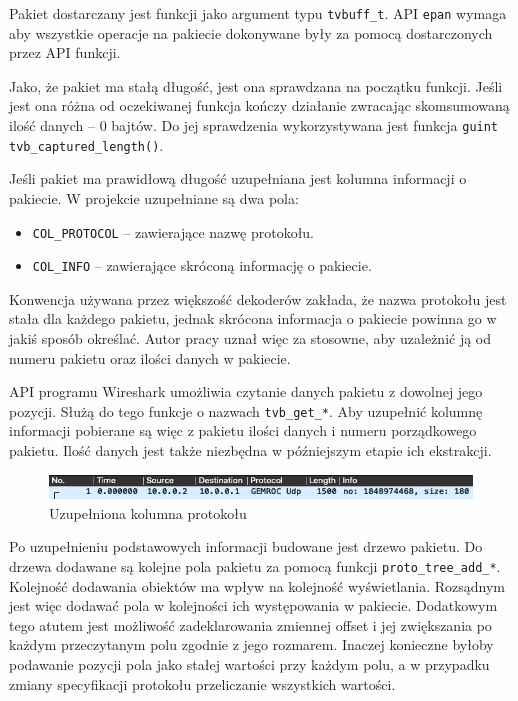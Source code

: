 \documentclass[a4paper, 12pt, twoside, openright]{article}
\begin{document}
Pakiet dostarczany jest funkcji jako argument typu \texttt{tvbuff\_t}. API \texttt{epan} wymaga aby wszystkie operacje
na pakiecie dokonywane były za pomocą dostarczonych przez API funkcji.

Jako, że pakiet ma stałą długość, jest ona sprawdzana na początku funkcji. Jeśli jest ona różna od oczekiwanej funkcja
kończy działanie zwracając skomsumowaną ilość danych -- 0 bajtów. Do jej sprawdzenia wykorzystywana jest funkcja
\texttt{guint tvb\_captured\_length()}.

Jeśli pakiet ma prawidłową długość uzupełniana jest kolumna informacji o pakiecie. W projekcie uzupełniane są dwa pola:
\begin{itemize}
	\item \texttt{COL\_PROTOCOL} -- zawierające nazwę protokołu.
	\item \texttt{COL\_INFO} -- zawierające skróconą informację o pakiecie.
\end{itemize}
Konwencja używana przez większość dekoderów zakłada, że nazwa protokołu jest stała dla każdego pakietu, jednak skrócona
informacja o pakiecie powinna go w jakiś sposób określać. Autor pracy uznał więc za stosowne, aby uzależnić ją
od numeru pakietu oraz ilości danych w pakiecie.

API programu Wireshark umożliwia czytanie danych pakietu z dowolnej jego pozycji. Służą do tego funkcje o nazwach \texttt{tvb\_get\_*}.
Aby uzupełnić kolumnę informacji pobierane są więc z pakietu ilości danych i numeru porządkowego pakietu. Ilość danych jest także niezbędna
w późniejszym etapie ich ekstrakcji.

\begin{figure}[ht]
	\centering
		\includegraphics[width=1.0\textwidth]{img/screenshot_col.png}
	\caption{Uzupełniona kolumna protokołu}
	\label{fig:col}
\end{figure}

Po uzupełnieniu podstawowych informacji budowane jest drzewo pakietu. Do drzewa dodawane są kolejne pola pakietu za pomocą
funkcji \texttt{proto\_tree\_add\_*}. Kolejność dodawania obiektów ma wpływ na kolejność wyświetlania. Rozsądnym jest więc
dodawać pola w kolejności ich występowania w pakiecie. Dodatkowym tego atutem jest możliwość zadeklarowania zmiennej offset
i jej zwiększania po każdym przeczytanym polu zgodnie z jego rozmarem. Inaczej konieczne byłoby podawanie pozycji pola jako
stałej wartości przy każdym polu, a w przypadku zmiany specyfikacji protokołu przeliczanie wszystkich wartości.
\end{document}
